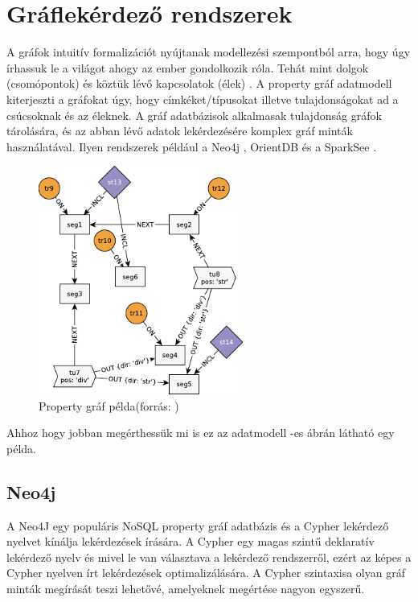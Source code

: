 \section{Gráflekérdező rendszerek}
A gráfok intuitív formalizációt nyújtanak modellezési szempontból arra, hogy úgy írhassuk le a világot 
ahogy az ember gondolkozik róla. Tehát mint dolgok (csomópontok) és köztük lévő kapcsolatok (élek)
\cite{marton2017model}. A property gráf adatmodell kiterjeszti a gráfokat úgy, hogy címkéket/típusokat
illetve tulajdonságokat ad a csúcsoknak és az éleknek. A gráf adatbázisok  alkalmasak tulajdonság
gráfok tárolására, és az abban lévő adatok lekérdezésére komplex gráf minták használatával. Ilyen
rendszerek például a    Neo4j \cite{neo4j}, OrientDB \cite{orientdb} és a  SparkSee \cite{sparksee}.

\begin{figure}
	\centering
	\includegraphics[width=0.6\textwidth]{figures/tulajdonsággráfpélda}
	\caption{Property gráf példa(forrás: \cite{marton2017model})}
	\label{fig:tulajdonsággráfpélda}
\end{figure}

Ahhoz hogy jobban megérthessük mi is ez az adatmodell  -es ábrán látható egy példa.
\subsection{Neo4j}

A Neo4J egy populáris NoSQL property gráf adatbázis és a Cypher lekérdező nyelvet kínálja lekérdezések 
írására. A Cypher egy magas szintű deklaratív lekérdező nyelv és mivel le van választava a lekérdező 
rendszerről, ezért az képes a Cypher nyelven írt lekérdezések optimalizálására. 
A Cypher szintaxisa olyan gráf minták megírását teszi lehetővé, amelyeknek megértése nagyon
egyszerű.


